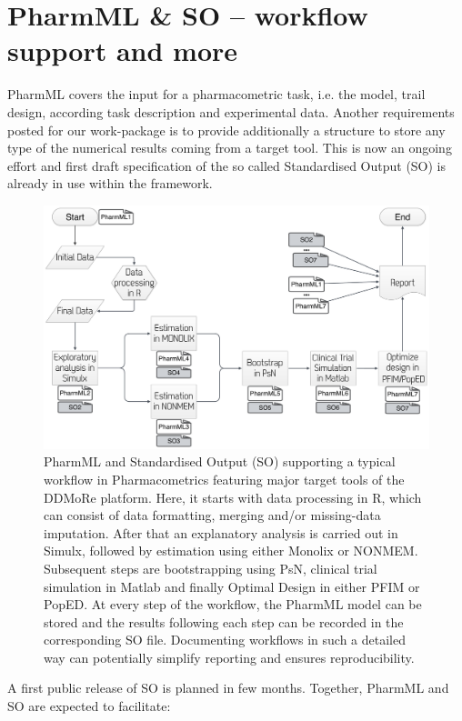\section{PharmML \& SO -- workflow support and more}
\label{intro:workflows}
PharmML covers the input for a pharmacometric task, i.e. the model, trail design, 
according task description and experimental data. Another requirements 
posted for our work-package is to provide additionally a structure to store any type
of the numerical results coming from a target tool. This is now an ongoing 
effort and first draft specification of the so called Standardised Output (SO)
is already in use within the framework. 
\begin{figure}[ht!]
\centering
  \includegraphics[width=0.95\linewidth]{pics/workflowPharmMLSO}
 \caption{PharmML and Standardised Output (SO) supporting a typical 
 workflow in Pharmacometrics featuring major target tools of the DDMoRe 
 platform. Here, it starts with data processing in R, which can consist of data 
 formatting, merging and/or missing-data imputation. After that an explanatory 
 analysis is carried out in Simulx, followed by estimation using either Monolix 
 or NONMEM. Subsequent steps are bootstrapping using PsN, clinical trial 
 simulation in Matlab and finally Optimal Design in either PFIM or PopED. 
 At every step of the workflow, the PharmML model can be stored and the 
 results following each step can be recorded in the corresponding SO file. 
 Documenting workflows in such a detailed way can potentially simplify 
 reporting and ensures reproducibility.}
 \label{fig:workflowPharmMLSO}
\end{figure}
A first public release of SO is planned in few months. Together, PharmML and SO 
are expected to facilitate:
